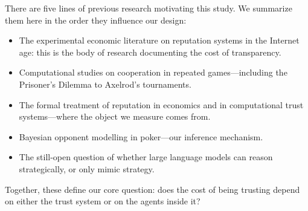 \documentclass[journal]{IEEEtran}
\begin{document}
There are five lines of previous research motivating this study. We
summarize them here in the order they influence our design:
\begin{itemize}\itemsep2pt
  \item The experimental economic literature on reputation systems in
  the Internet age: this is the body of research documenting the cost
  of transparency.
  \item Computational studies on cooperation in repeated
  games---including the Prisoner's Dilemma to Axelrod's tournaments.
  \item The formal treatment of reputation in economics and in
  computational trust systems---where the object we measure comes from.
  \item Bayesian opponent modelling in poker---our inference mechanism.
  \item The still-open question of whether large language models can
  reason strategically, or only mimic strategy.
\end{itemize}
Together, these define our core question: does the cost of being
trusting depend on either the trust system or on the agents inside
it?
\end{document}

